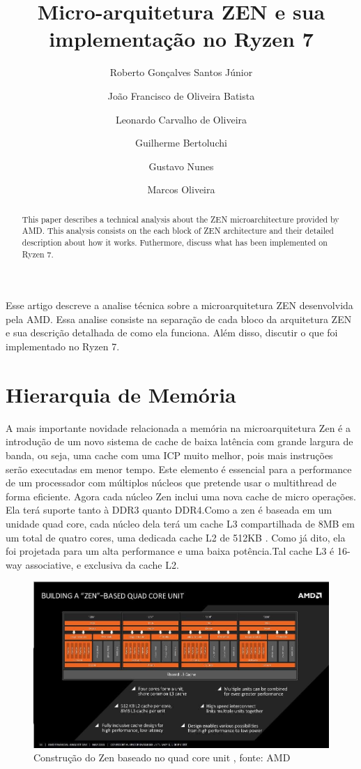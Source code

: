 \documentclass[12pt]{article}
\title{Micro-arquitetura ZEN e sua implementação no Ryzen 7}
\author{Roberto Gonçalves Santos Júnior \and João Francisco de Oliveira Batista 
\and Leonardo Carvalho de Oliveira \and Guilherme Bertoluchi \and Gustavo Nunes \and Marcos Oliveira}
\begin{document}
 

\maketitle
\thispagestyle{empty}
\newpage

\tableofcontents
\thispagestyle{empty}
\newpage

\begin{abstract}
  This paper describes a technical analysis about the ZEN microarchitecture provided by AMD. This analysis consists on the each block of ZEN architecture and their detailed description about how it works. Futhermore, discuss what has been implemented on Ryzen 7.
\end{abstract}

\begin{resumo}
  Esse artigo descreve a analise técnica sobre a microarquitetura ZEN desenvolvida pela AMD. Essa analise consiste na separação de cada bloco da arquitetura ZEN e sua descrição detalhada de como ela funciona. Além disso, discutir o que foi implementado no Ryzen 7. 
\end{resumo}

\thispagestyle{empty}
\newpage

\section{Hierarquia de Memória}
A mais importante novidade relacionada a memória na microarquitetura Zen é a introdução de um novo sistema de cache de baixa latência com grande largura de banda, ou seja, uma cache com uma ICP muito melhor, pois mais instruções serão executadas em menor tempo. Este elemento é essencial para a performance de um processador com múltiplos núcleos que pretende usar o multithread de forma eficiente.
Agora cada núcleo Zen inclui uma nova cache de micro operações.
Ela terá suporte tanto à DDR3 quanto DDR4.Como a zen é baseada em um unidade quad core, cada núcleo dela terá um cache L3 compartilhada de 8MB em um total de quatro cores, uma dedicada cache L2 de 512KB . Como já dito, ela foi projetada para um alta performance e uma baixa potência.Tal cache L3 é 16-way associative, e exclusiva da cache L2.

\begin{figure}[H]
\centering
\includegraphics[width=120mm,scale=0.8]{amd.jpg}
\caption{Construção do Zen baseado no quad core unit , fonte: AMD}
\label{fig:amd}
\end{figure}
\end{document}
